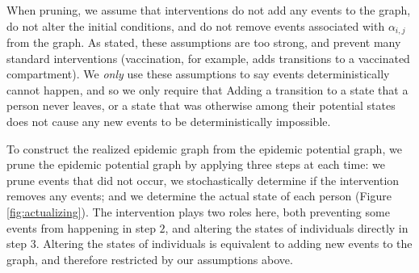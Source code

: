 \documentclass[PTRSB]{rsos}
\begin{document}
\begin{multicols}{2}
When pruning, we assume that interventions do not add any events to the graph, do not alter the initial conditions, and do not remove events associated with $\alpha_{i,j}$ from the graph.
As stated, these assumptions are too strong, and prevent many standard interventions (vaccination, for example, adds transitions to a vaccinated compartment).
We \emph{only} use these assumptions to say events deterministically cannot happen, and so we only require that 
Adding a transition to a state that a person never leaves, or a state that was otherwise among their potential states does not cause any new events to be deterministically impossible.

To construct the realized epidemic graph from the epidemic potential graph, we prune the epidemic potential graph by applying three steps at each time: we prune events that did not occur, we stochastically determine if the intervention removes any events; and we determine the actual state of each person (Figure \ref{fig:actualizing}).
The intervention plays two roles here, both preventing some events from happening in step $2$, and altering the states of individuals directly in step $3$.
Altering the states of individuals is equivalent to adding new events to the graph, and therefore restricted by our assumptions above.


\end{multicols}
\end{document}
